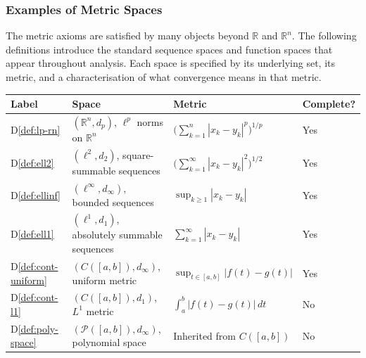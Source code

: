 \subsubsection{Examples of Metric Spaces}
\label{sec:examples-metric-spaces}

The metric axioms are satisfied by many objects beyond $\mathbb{R}$ and
$\mathbb{R}^n$. The following definitions introduce the standard sequence
spaces and function spaces that appear throughout analysis.
Each space is specified by its underlying set, its metric, and a
characterisation of what convergence means in that metric.

\begin{tcolorbox}[colback=gray!6, colframe=gray!40, arc=2pt,
  left=6pt, right=6pt, top=4pt, bottom=4pt,
  title={\small\textbf{Examples of Metric Spaces --- Quick Reference}},
  fonttitle=\small\bfseries]
\small
\begin{tabular}{l l l l}
\toprule
\textbf{Label} & \textbf{Space} & \textbf{Metric} & \textbf{Complete?} \\
\midrule
D\ref{def:lp-rn}
  & $(\mathbb{R}^n, d_p)$, $\ell^p$ norms on $\mathbb{R}^n$
  & $\bigl(\sum_{k=1}^n|x_k-y_k|^p\bigr)^{1/p}$
  & Yes \\
D\ref{def:ell2}
  & $(\ell^2, d_2)$, square-summable sequences
  & $\bigl(\sum_{k=1}^\infty|x_k-y_k|^2\bigr)^{1/2}$
  & Yes \\
D\ref{def:ellinf}
  & $(\ell^\infty, d_\infty)$, bounded sequences
  & $\sup_{k\ge1}|x_k-y_k|$
  & Yes \\
D\ref{def:ell1}
  & $(\ell^1, d_1)$, absolutely summable sequences
  & $\sum_{k=1}^\infty|x_k-y_k|$
  & Yes \\
D\ref{def:cont-uniform}
  & $(C([a,b]),d_\infty)$, uniform metric
  & $\sup_{t\in[a,b]}|f(t)-g(t)|$
  & Yes \\
D\ref{def:cont-l1}
  & $(C([a,b]),d_1)$, $L^1$ metric
  & $\int_a^b|f(t)-g(t)|\,dt$
  & No \\
D\ref{def:poly-space}
  & $(\mathcal{P}([a,b]),d_\infty)$, polynomial space
  & Inherited from $C([a,b])$
  & No \\
\bottomrule
\end{tabular}
\end{tcolorbox}


